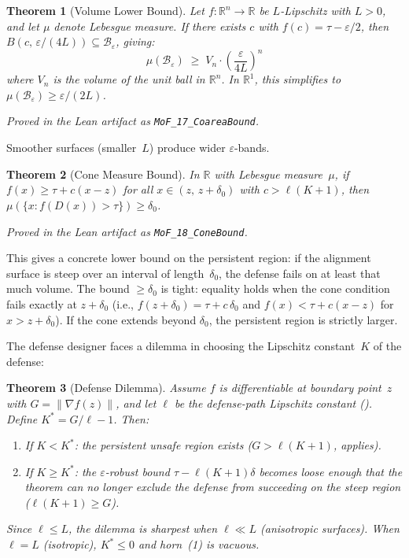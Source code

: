 \documentclass{article}
\newtheorem{theorem}{Theorem}[section]
\newcommand{\R}{\mathbb{R}}
\begin{document}
\begin{theorem}[Volume Lower Bound]
\label{thm:coarea}
Let $f\colon \R^n \to \R$ be $L$-Lipschitz with $L > 0$, and let
$\mu$ denote Lebesgue measure. If there exists $c$ with
$f(c) = \tau - \varepsilon/2$, then
$B(c,\, \varepsilon/(4L)) \subseteq
\mathcal{B}_\varepsilon$, giving:
\begin{equation}
  \mu(\mathcal{B}_\varepsilon)
  \;\geq\; V_n \cdot \left(\frac{\varepsilon}{4L}\right)^{\!n}
\end{equation}
where $V_n$ is the volume of the unit ball in $\R^n$. In $\R^1$,
this simplifies to $\mu(\mathcal{B}_\varepsilon) \geq \varepsilon/(2L)$.
\end{theorem}

\noindent\emph{Proved in the Lean artifact as \textup{\texttt{MoF\_17\_CoareaBound}}.}

Smoother surfaces (smaller~$L$) produce wider $\varepsilon$-bands.

\begin{theorem}[Cone Measure Bound]
\label{thm:cone}
In $\R$ with Lebesgue measure~$\mu$, if
$f(x) \geq \tau + c(x - z)$ for all $x \in (z,\, z + \delta_0)$
with $c > \ell(K+1)$, then
$\mu(\{x : f(D(x)) > \tau\}) \geq \delta_0$.
\end{theorem}

\noindent\emph{Proved in the Lean artifact as \textup{\texttt{MoF\_18\_ConeBound}}.}

This gives a concrete lower bound on the persistent region: if the
alignment surface is steep over an interval of length~$\delta_0$, the
defense fails on at least that much volume. The bound $\geq \delta_0$
is tight: equality holds when the cone condition fails exactly at
$z + \delta_0$ (i.e., $f(z+\delta_0) = \tau + c\,\delta_0$ and
$f(x) < \tau + c(x-z)$ for $x > z + \delta_0$). If the cone extends
beyond $\delta_0$, the persistent region is strictly larger.

The defense designer faces a dilemma in choosing the Lipschitz
constant~$K$ of the defense:

\begin{theorem}[Defense Dilemma]
\label{thm:dilemma}
Assume $f$ is differentiable at boundary point~$z$ with
$G = \|\nabla f(z)\|$, and let $\ell$ be
the defense-path Lipschitz constant (). Define
$K^* = G/\ell - 1$. Then:
\begin{enumerate}[nosep]
  \item If $K < K^*$: the persistent unsafe region exists
    ($G > \ell(K+1)$,  applies).
  \item If $K \geq K^*$: the $\varepsilon$-robust bound
    $\tau - \ell(K+1)\delta$ becomes loose enough that the theorem
    can no longer exclude the defense from succeeding on the steep
    region ($\ell(K+1) \geq G$).
\end{enumerate}
Since $\ell \leq L$, the dilemma is sharpest when $\ell \ll L$
(anisotropic surfaces). When $\ell = L$ (isotropic), $K^* \leq 0$
and horn~(1) is vacuous.
\end{theorem}
\end{document}
